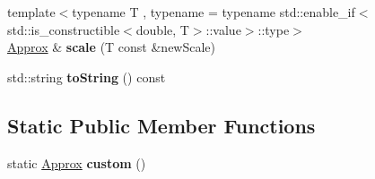 \begin{DoxyCompactItemize}
\item 
{\footnotesize template$<$typename T , typename  = typename std\+::enable\+\_\+if$<$std\+::is\+\_\+constructible$<$double, T$>$\+::value$>$\+::type$>$ }\\\hyperlink{classCatch_1_1Detail_1_1Approx}{Approx} \& {\bfseries scale} (T const \&new\+Scale)\hypertarget{classCatch_1_1Detail_1_1Approx_a8f4d2def2920a3840d3271f6d9c5ede2}{}\label{classCatch_1_1Detail_1_1Approx_a8f4d2def2920a3840d3271f6d9c5ede2}

\item 
std\+::string {\bfseries to\+String} () const \hypertarget{classCatch_1_1Detail_1_1Approx_adeb74b73506b3f6b2ba72aea15168fbe}{}\label{classCatch_1_1Detail_1_1Approx_adeb74b73506b3f6b2ba72aea15168fbe}

\end{DoxyCompactItemize}
\subsection*{Static Public Member Functions}
\begin{DoxyCompactItemize}
\item 
static \hyperlink{classCatch_1_1Detail_1_1Approx}{Approx} {\bfseries custom} ()\hypertarget{classCatch_1_1Detail_1_1Approx_aaf86dc0ee92272ac2d9839197a07951d}{}\label{classCatch_1_1Detail_1_1Approx_aaf86dc0ee92272ac2d9839197a07951d}

\end{DoxyCompactItemize}
